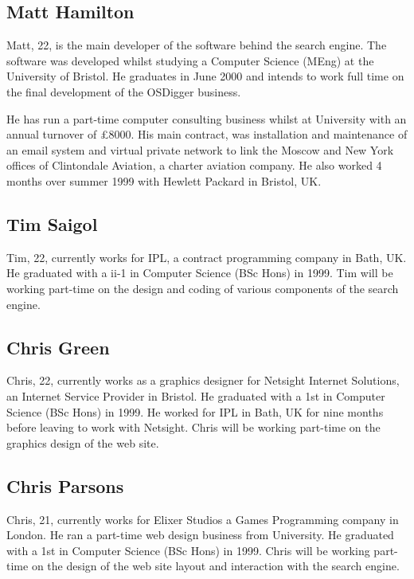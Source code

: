 \subsection{Matt Hamilton}
Matt, 22, is the main developer of the software behind the search engine.  The software was developed whilst studying a Computer Science (MEng) at the University of Bristol.  He graduates in June 2000 and intends to work full time on the final development of the OSDigger business.

He has run a part-time computer consulting business whilst at University with an annual turnover of \pounds8000.  His main contract, was installation and maintenance of an email system and virtual private network to link the Moscow and New York offices of Clintondale Aviation, a charter aviation company.  He also worked 4 months over summer 1999 with Hewlett Packard in Bristol, UK.

\subsection{Tim Saigol}
Tim, 22, currently works for IPL, a contract programming company in Bath, UK.  He graduated with a ii-1 in Computer Science (BSc Hons) in 1999.  Tim will be working part-time on the design and coding of various components of the search engine.

\subsection{Chris Green}
Chris, 22, currently works as a graphics designer for Netsight Internet Solutions, an Internet Service Provider in Bristol.  He graduated with a 1st in Computer Science (BSc Hons) in 1999.  He worked for IPL in Bath, UK for nine months before leaving to work with Netsight.  Chris will be working part-time on the graphics design of the web site.

\subsection{Chris Parsons}
Chris, 21, currently works for Elixer Studios a Games Programming company in London.  He ran a part-time web design business from University.  He graduated with a 1st in Computer Science (BSc Hons) in 1999.  Chris will be working part-time on the design of the web site layout and interaction with the search engine.

